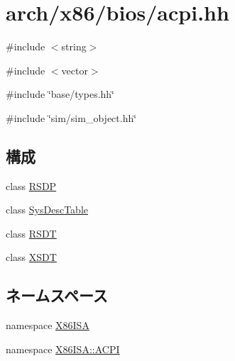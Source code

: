 \hypertarget{acpi_8hh}{
\section{arch/x86/bios/acpi.hh}
\label{acpi_8hh}
}
{\ttfamily \#include $<$string$>$}\par
{\ttfamily \#include $<$vector$>$}\par
{\ttfamily \#include \char`\"{}base/types.hh\char`\"{}}\par
{\ttfamily \#include \char`\"{}sim/sim\_\-object.hh\char`\"{}}\par
\subsection*{構成}
\begin{DoxyCompactItemize}
\item 
class \hyperlink{classX86ISA_1_1ACPI_1_1RSDP}{RSDP}
\item 
class \hyperlink{classX86ISA_1_1ACPI_1_1SysDescTable}{SysDescTable}
\item 
class \hyperlink{classX86ISA_1_1ACPI_1_1RSDT}{RSDT}
\item 
class \hyperlink{classX86ISA_1_1ACPI_1_1XSDT}{XSDT}
\end{DoxyCompactItemize}
\subsection*{ネームスペース}
\begin{DoxyCompactItemize}
\item 
namespace \hyperlink{namespaceX86ISA}{X86ISA}
\item 
namespace \hyperlink{namespaceX86ISA_1_1ACPI}{X86ISA::ACPI}
\end{DoxyCompactItemize}
